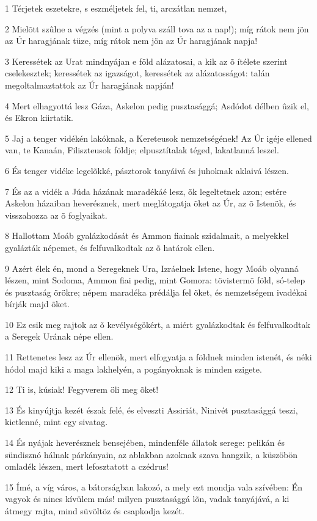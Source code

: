 \par 1 Térjetek eszetekre, s eszméljetek fel, ti, arczátlan nemzet,
\par 2 Mielõtt szûlne a végzés (mint a polyva száll tova az a nap!); míg rátok nem jön az Úr haragjának tüze, míg rátok nem jön az Úr haragjának napja!
\par 3 Keressétek az Urat mindnyájan e föld alázatosai, a kik az õ ítélete szerint cselekesztek; keressétek az igazságot, keressétek az alázatosságot: talán megoltalmaztattok az Úr haragjának napján!
\par 4 Mert elhagyottá lesz Gáza, Askelon pedig pusztasággá; Asdódot délben ûzik el, és Ekron kiirtatik.
\par 5 Jaj a tenger vidékén lakóknak, a Kereteusok nemzetségének! Az Úr igéje ellened van, te Kanaán, Filiszteusok földje; elpusztítalak téged, lakatlanná leszel.
\par 6 És tenger vidéke legelõkké, pásztorok tanyáivá és juhoknak aklaivá lészen.
\par 7 És az a vidék a Júda házának maradékáé lesz, õk legeltetnek azon; estére Askelon házaiban heverésznek, mert meglátogatja õket az Úr, az õ Istenök, és visszahozza az õ foglyaikat.
\par 8 Hallottam Moáb gyalázkodását és Ammon fiainak szidalmait, a melyekkel gyalázták népemet, és felfuvalkodtak az õ határok ellen.
\par 9 Azért élek én, mond a Seregeknek Ura, Izráelnek Istene, hogy Moáb olyanná lészen, mint Sodoma, Ammon fiai pedig, mint Gomora: tövistermõ föld, só-telep és pusztaság örökre; népem maradéka prédálja fel õket, és nemzetségem ivadékai bírják majd õket.
\par 10 Ez esik meg rajtok az õ kevélységökért, a miért gyalázkodtak és felfuvalkodtak a Seregek Urának népe ellen.
\par 11 Rettenetes lesz az Úr ellenök, mert elfogyatja a földnek minden istenét, és néki hódol majd kiki a maga lakhelyén, a pogányoknak is minden szigete.
\par 12 Ti is, kúsiak! Fegyverem öli meg õket!
\par 13 És kinyújtja kezét észak felé, és elveszti Assiriát, Ninivét pusztasággá teszi, kietlenné, mint egy sivatag.
\par 14 És nyájak heverésznek bensejében, mindenféle állatok serege: pelikán és sündisznó hálnak párkányain, az ablakban azoknak szava hangzik, a küszöbön omladék lészen, mert lefosztatott a czédrus!
\par 15 Ímé, a víg város, a bátorságban lakozó, a mely ezt mondja vala szívében: Én vagyok és nincs kívülem más! milyen pusztasággá lõn, vadak tanyájává, a ki átmegy rajta, mind süvöltöz és csapkodja kezét.

